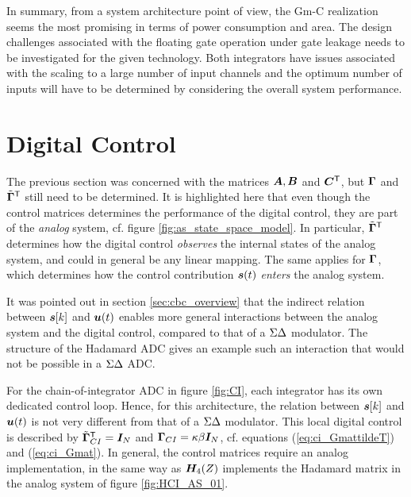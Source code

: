 In summary, from a system architecture point of view, the Gm-C realization seems the most promising in terms of power consumption and area. The design challenges associated with the floating gate operation under gate leakage needs to be investigated for the given technology. Both integrators have issues associated with the scaling to a large number of input channels and the optimum number of inputs will have to be determined by considering the overall system performance.
















\section{Digital Control}
The previous section was concerned with the matrices $\bm{A}, \bm{B}$ and $\bm{C}^\mathsf{T}$, but $\bm{\Gamma}$ and $\tilde{\bm{\Gamma}}^\mathsf{T}$ still need to be determined. It is highlighted here that even though the control matrices determines the performance of the digital control, they are part of the \textit{analog} system, cf. figure \ref{fig:as_state_space_model}. In particular, $\tilde{\bm{\Gamma}}^\mathsf{T}$ determines how the digital control \textit{observes} the internal states of the analog system, and could in general be any linear mapping. The same applies for $\bm{\Gamma}$, which determines how the control contribution $\bm{s}(t)$ \textit{enters} the analog system.

It was pointed out in section \ref{sec:cbc_overview} that the indirect relation between $\bm{s}[k]$ and $\bm{u}(t)$ enables more general interactions between the analog system and the digital control, compared to that of a $\Sigma\Delta$ modulator. The structure of the Hadamard ADC gives an example such an interaction that would not be possible in a $\Sigma\Delta$ ADC.

For the chain-of-integrator ADC in figure \ref{fig:CI}, each integrator has its own dedicated control loop. Hence, for this architecture, the relation between $\bm{s}[k]$ and $\bm{u}(t)$ is not very different from that of a $\Sigma\Delta$ modulator. This local digital control is described by $\tilde{\bm{\Gamma}}^\mathsf{T}_{CI} = \bm{I}_{N}$ and $\bm{\Gamma}_{CI} = \kappa \beta \bm{I}_{N}$, cf. equations (\ref{eq:ci_GmattildeT}) and (\ref{eq:ci_Gmat}). In general, the control matrices require an analog implementation, in the same way as $\bm{H_}{4}(Z)$ implements the Hadamard matrix in the analog system of figure \ref{fig:HCI_AS_01}.



